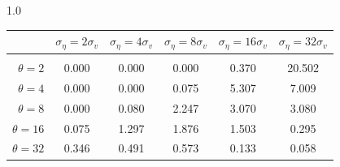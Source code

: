 \documentclass[12pt]{article}
\begin{document}
\begin{table}[h!]
\vspace{10pt}
\begin{subtable}{1.0\textwidth}
    \centering
\begin{tabular}{rccccc}
\hline  
            & \multicolumn{1}{l}{$\sigma_{\eta} =2\sigma_{v}$} & \multicolumn{1}{l}{$\sigma_{\eta} =4\sigma_{v}$} & \multicolumn{1}{l}{$\sigma_{\eta} =8\sigma_{v}$} & \multicolumn{1}{l}{$\sigma_{\eta} =16\sigma_{v}$} & \multicolumn{1}{l}{$\sigma_{\eta} =32\sigma_{v}$} \\ \hline  \vspace{-3mm} \\        
$\theta=2$  & 0.000                                             & 0.000                                             & 0.000                                             & 0.370                                              & 20.502                                             \\ \hline
$\theta=4$  & 0.000                                             & 0.000                                             & 0.075                                             & 5.307                                              & 7.009                                              \\ \hline
$\theta=8$  & 0.000                                             & 0.080                                             & 2.247                                             & 3.070                                              & 3.080                                              \\ \hline
$\theta=16$ & 0.075                                             & 1.297                                             & 1.876                                             & 1.503                                              & 0.295                                              \\ \hline
$\theta=32$ & 0.346                                             & 0.491                                             & 0.573                                             & 0.133                                              & 0.058                                              \\ \hline
\end{tabular}
\end{subtable}


\end{table}
\end{document}
